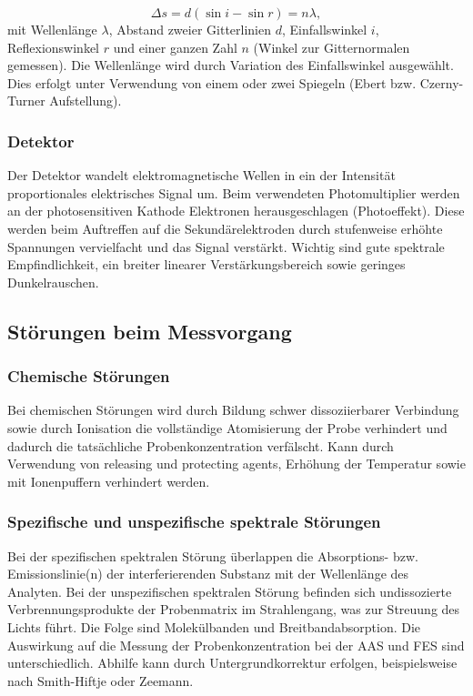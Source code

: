         \begin{equation}
          \Delta s = d \left(\sin i - \sin r\right) = n \lambda,
        \end{equation}
      mit Wellenlänge $\lambda$, Abstand zweier Gitterlinien $d$, Einfallswinkel $i$, Reflexionswinkel $r$ und einer ganzen Zahl $n$ (Winkel zur Gitternormalen gemessen). Die Wellenlänge wird durch Variation des Einfallswinkel ausgewählt. Dies erfolgt unter Verwendung von einem oder zwei Spiegeln (Ebert bzw. Czerny-Turner Aufstellung). \citep{AnalytikIII}
      
    \subsubsection{Detektor}
      
      Der Detektor wandelt elektromagnetische Wellen in ein der Intensität proportionales elektrisches Signal um. Beim verwendeten Photomultiplier werden an der photosensitiven Kathode Elektronen herausgeschlagen (Photoeffekt). Diese werden beim Auftreffen auf die Sekundärelektroden durch stufenweise erhöhte Spannungen vervielfacht und das Signal verstärkt. Wichtig sind gute spektrale Empfindlichkeit, ein breiter linearer Verstärkungsbereich sowie geringes Dunkelrauschen. \citep{AnalytikIII}
      
  \subsection{Störungen beim Messvorgang}
    
    \subsubsection{Chemische Störungen}
    
      Bei chemischen Störungen wird durch Bildung schwer dissoziierbarer Verbindung sowie durch Ionisation die vollständige Atomisierung der Probe verhindert und dadurch die tatsächliche Probenkonzentration verfälscht. Kann durch Verwendung von releasing und protecting agents, Erhöhung der Temperatur sowie mit Ionenpuffern verhindert werden. \citep{AnalytikIII}
  
    \subsubsection{Spezifische und unspezifische spektrale Störungen}
      
      Bei der spezifischen spektralen Störung überlappen die Absorptions- bzw. Emissionslinie(n) der interferierenden Substanz mit der Wellenlänge des Analyten. Bei der unspezifischen spektralen Störung befinden sich undissozierte Verbrennungsprodukte der Probenmatrix im Strahlengang, was zur Streuung des Lichts führt. Die Folge sind Molekülbanden und Breitbandabsorption. Die Auswirkung auf die Messung der Probenkonzentration bei der AAS und FES sind unterschiedlich. Abhilfe kann durch Untergrundkorrektur erfolgen, beispielsweise nach Smith-Hiftje oder Zeemann. \citep{AnalytikIII}
  
      